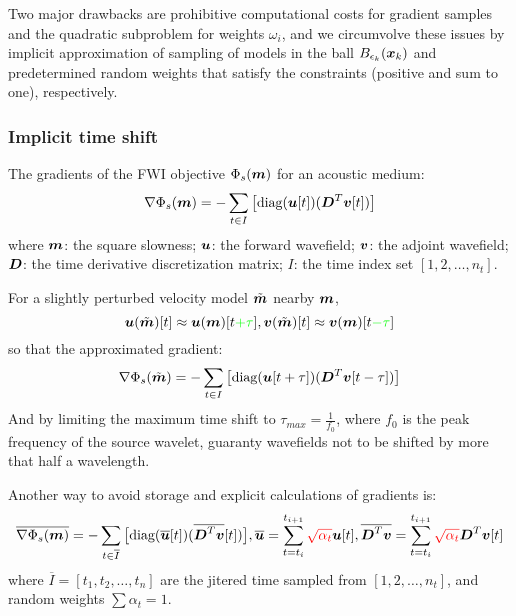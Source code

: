 Two major drawbacks are prohibitive computational costs for gradient samples
and the quadratic subproblem for weights $\omega_i$,
and we circumvolve these issues by implicit approximation of sampling of models
in the ball $B_{\epsilon_k}(\boldsymbol{x}_k)$
and predetermined random weights that satisfy the constraints
(positive and sum to one), respectively.

\subsubsection{Implicit time shift}
The gradients of the FWI objective $\Phi_s(\boldsymbol{m})$ for an acoustic medium:
\[ \nabla\Phi_s(\boldsymbol{m})=-\sum_{t\in I}\big[\text{diag}(\boldsymbol{u}[t])(\boldsymbol{D}^T\boldsymbol{v}[t])\big] \]
where $\boldsymbol{m}$: the square slowness; $\boldsymbol{u}$: the forward wavefield; $\boldsymbol{v}$:
the adjoint wavefield; $\boldsymbol{D}$: the time derivative discretization matrix; $I$:
the time index set $[1,2,\ldots,n_t]$.

For a slightly perturbed velocity model $\tilde{\boldsymbol{m}}$ nearby $\boldsymbol{m}$,
\[ \boldsymbol{u}(\tilde{\boldsymbol{m}})[t]\approx\boldsymbol{u}(\boldsymbol{m})[t{\color{green}+\tau}],\boldsymbol{v}(\tilde{\boldsymbol{m}})[t]\approx\boldsymbol{v}(\boldsymbol{m})[t{\color{green}-\tau}] \]
so that the approximated gradient:
\[ \nabla\Phi_s(\tilde{\boldsymbol{m}})=-\sum_{t\in I}\big[\text{diag}(\boldsymbol{u}[t+\tau])(\boldsymbol{D}^T\boldsymbol{v}[t-\tau])\big] \]
And by limiting the maximum time shift to $\tau_{max}=\frac{1}{f_0}$,
where $f_0$ is the peak frequency of the source wavelet,
guaranty wavefields not to be shifted by more that half a wavelength.

Another way to avoid storage and explicit calculations of gradients is:
\[ \overline{\nabla\Phi_s(\boldsymbol{m})}=-\sum_{t\in\overline I}\big[\text{diag}(\overline{\boldsymbol{u}}[t])(\overline{\boldsymbol{D}^T\boldsymbol{v}}[t])\big],\overline{\boldsymbol{u}}=\sum_{t=t_i}^{t_{i+1}}{\color{red}\sqrt{\alpha_t}}\boldsymbol{u}[t], \overline{\boldsymbol{D}^T\boldsymbol{v}}=\sum_{t=t_i}^{t_{i+1}}{\color{red}\sqrt{\alpha_t}}\boldsymbol{D}^T\boldsymbol{v}[t] \]
where $\overline I=[t_1,t_2,\ldots,t_n]$ are the jitered time sampled from $[1,2,\ldots,n_t]$,
and random weights $\sum\alpha_t=1$.

